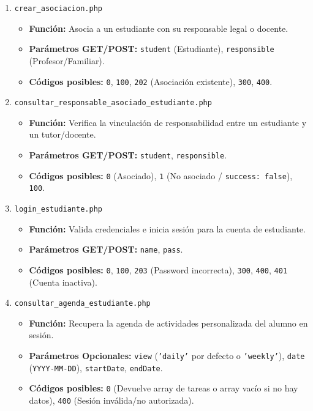 \begin{enumerate}
    \item \texttt{crear\_asociacion.php}
    \begin{itemize}
        \item \textbf{Función:} Asocia a un estudiante con su responsable legal o docente.
        \item \textbf{Parámetros GET/POST:} \texttt{student} (Estudiante), \texttt{responsible} (Profesor/Familiar).
        \item \textbf{Códigos posibles:} \texttt{0}, \texttt{100}, \texttt{202} (Asociación existente), \texttt{300}, \texttt{400}.
    \end{itemize}

    \item \texttt{consultar\_responsable\_asociado\_estudiante.php}
    \begin{itemize}
        \item \textbf{Función:} Verifica la vinculación de responsabilidad entre un estudiante y un tutor/docente.
        \item \textbf{Parámetros GET/POST:} \texttt{student}, \texttt{responsible}.
        \item \textbf{Códigos posibles:} \texttt{0} (Asociado), \texttt{1} (No asociado / \texttt{success: false}), \texttt{100}.
    \end{itemize}

    \item \texttt{login\_estudiante.php}
    \begin{itemize}
        \item \textbf{Función:} Valida credenciales e inicia sesión para la cuenta de estudiante.
        \item \textbf{Parámetros GET/POST:} \texttt{name}, \texttt{pass}.
        \item \textbf{Códigos posibles:} \texttt{0}, \texttt{100}, \texttt{203} (Password incorrecta), \texttt{300}, \texttt{400}, \texttt{401} (Cuenta inactiva).
    \end{itemize}

    \item \texttt{consultar\_agenda\_estudiante.php}
    \begin{itemize}
        \item \textbf{Función:} Recupera la agenda de actividades personalizada del alumno en sesión.
        \item \textbf{Parámetros Opcionales:} \texttt{view} (\texttt{'daily'} por defecto o \texttt{'weekly'}), \texttt{date} (\texttt{YYYY-MM-DD}), \texttt{startDate}, \texttt{endDate}.
        \item \textbf{Códigos posibles:} \texttt{0} (Devuelve array de tareas o array vacío si no hay datos), \texttt{400} (Sesión inválida/no autorizada).
    \end{itemize}


\end{enumerate}
